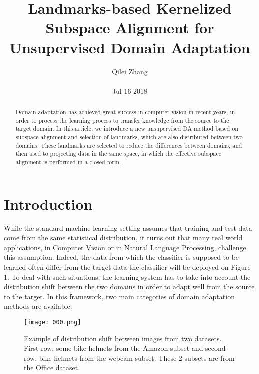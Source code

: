 \documentclass[30pt,twocolumn,letterpaper]{article}
\author{Qilei Zhang\\\\
Jul 16 2018}
\title{Landmarks-based Kernelized Subspace Alignment for Unsupervised Domain Adaptation}
\begin{document}
\maketitle
\begin{abstract}
  Domain adaptation has achieved great success in computer vision in recent years, in order to process the learning process to transfer knowledge from the source to the target domain. In this article, we introduce a new unsupervised DA method based on subspace alignment and selection of landmarks, which are also distributed between two domains. These landmarks are selected to reduce the differences between domains, and then used to projecting data in the same space, in which the effective subspace alignment is performed in a closed form.
\end{abstract}
\section{Introduction}
While the standard machine learning setting assumes that training and test data come from the same statistical distribution, it turns out that many real world applications, in Computer Vision or in Natural Language Processing, challenge this assumption\cite{Wu2014Learning}. Indeed, the data from which the classifier is supposed to be learned often differ from the target data the classifier will be deployed on Figure 1. To deal with such situations, the learning system has to take into account the distribution shift between the two domains in order to adapt well from the source to the target. In this framework, two main categories of domain adaptation methods are available\cite{Sun2016Discriminative}. \\
\begin{figure}[htbp]
\small
\centering
\texttt{[image: 000.png]}
\caption{Example of distribution shift between images from two
datasets. First row, some bike helmets from the Amazon subset
and second row, bike helmets from the webcam subset. These 2
subsets are from the Office dataset.
}
\label{fig:lable}
\end{figure}\\
\end{document}
